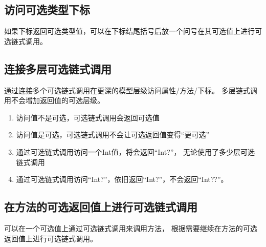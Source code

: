 \documentclass{../main.tex}{subfiles}
\begin{document}
\subsection{访问可选类型下标}
如果下标返回可选类型值，可以在下标结尾括号后放一个问号在其可选值上进行可选链式调用。

\subsection{连接多层可选链式调用}
通过连接多个可选链式调用在更深的模型层级访问属性/方法/下标。
多层链式调用不会增加返回值的可选层级。
\begin{enumerate}[itemsep=0pt, parsep=0pt, topsep=0pt, partopsep=0pt]
    \item 访问值不是可选，可选链式调用会返回可选值
    \item 访问值是可选，可选链式调用不会让可选返回值变得``更可选''
    \item 通过可选链式调用访问一个Int值，将会返回``Int?''，
            无论使用了多少层可选链式调用
    \item 通过可选链式调用访问``Int?''，依旧返回``Int?''，不会返回``Int??''。
\end{enumerate}

\subsection{在方法的可选返回值上进行可选链式调用}
可以在一个可选值上通过可选链式调用来调用方法，
    根据需要继续在方法的可选返回值上进行可选链式调用。



\end{document}
